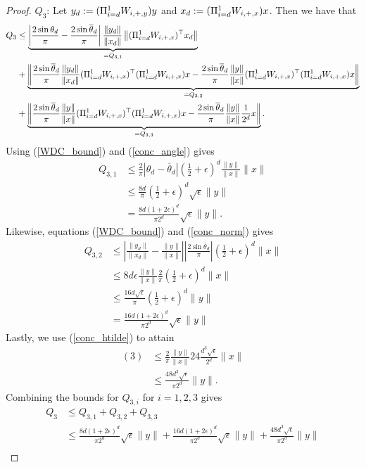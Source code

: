 \documentclass{article}
\begin{document}
\begin{proof}
$Q_3$: Let $y_d : = (\Pi_{i=d}^1 W_{i,+,y})y$ and $x_d : = (\Pi_{i=d}^1 W_{i,+,x})x$. Then we have that \begin{align*}
Q_3 & \leq \underbrace{\left|\frac{2\sin \theta_d}{\pi} - \frac{2\sin \overline{\theta}_d}{\pi}\right|\frac{\|y_d\|}{\|x_d\|}\left\|(\Pi_{i=d}^1 W_{i,+,x})^\top x_d\right\|}_{=Q_{3,1}} \\
& + \underbrace{\left\|\frac{2\sin \overline{\theta}_d}{\pi}\frac{\|y_d\|}{\|x_d\|}(\Pi_{i=d}^1 W_{i,+,x})^\top(\Pi_{i=d}^1 W_{i,+,x})x - \frac{2\sin \overline{\theta}_d}{\pi} \frac{\|y\|}{\|x\|}(\Pi_{i=d}^1 W_{i,+,x})^\top(\Pi_{i=d}^1 W_{i,+,x})x \right\|}_{=Q_{3,2}} \\
& + \underbrace{\left\|\frac{2\sin \overline{\theta}_d}{\pi}\frac{\|y\|}{\|x\|}(\Pi_{i=d}^1 W_{i,+,x})^\top(\Pi_{i=d}^1 W_{i,+,x})x - \frac{2\sin \overline{\theta}_d}{\pi}\frac{\|y\|}{\|x\|}\frac{1}{2^d}x\right\|}_{=Q_{3,3}}.
\end{align*} Using (\ref{WDC_bound}) and (\ref{conc_angle}) gives \begin{align*}
Q_{3,1} & \leq \frac{2}{\pi}|\theta_d - \overline{\theta}_d| \left(\frac{1}{2} + \epsilon\right)^d\frac{\|y\|}{\|x\|}\|x\| \\
& \leq \frac{8d}{\pi}\left(\frac{1}{2} + \epsilon\right)^d \sqrt{\epsilon} \|y\| \\
& = \frac{8d(1 + 2\epsilon)^d}{\pi 2^d}\sqrt{\epsilon}\|y\|.
\end{align*} Likewise, equations (\ref{WDC_bound}) and (\ref{conc_norm}) gives \begin{align*}
Q_{3,2} & \leq \left|\frac{\|y_d\|}{\|x_d\|} - \frac{\|y\|}{\|x\|}\right|\left|\frac{2\sin \overline{\theta}_d}{\pi}\right|\left(\frac{1}{2} + \epsilon\right)^d\|x\| \\
& \leq 8d\epsilon \frac{\|y\|}{\|x\|} \frac{2}{\pi}\left(\frac{1}{2} + \epsilon\right)^d \|x\| \\
& \leq \frac{16d\sqrt{\epsilon}}{\pi} \left(\frac{1}{2} + \epsilon\right)^d \|y\| \\
& = \frac{16d(1+2\epsilon)^d}{\pi 2^d}\sqrt{\epsilon}\|y\|
\end{align*} Lastly, we use (\ref{conc_htilde}) to attain \begin{align*}
(3) & \leq \frac{2}{\pi} \frac{\|y\|}{\|x\|} 24\frac{d^3\sqrt{\epsilon}}{2^d}\|x\| \\
& \leq \frac{48d^3\sqrt{\epsilon}}{\pi2^d}\|y\|.
\end{align*} Combining the bounds for $Q_{3,i}$ for $i = 1,2,3$ gives \begin{align*}
Q_{3} & \leq Q_{3,1} + Q_{3,2} + Q_{3,3} \\ 
& \leq \frac{8d(1 + 2\epsilon)^d}{\pi 2^d}\sqrt{\epsilon}\|y\|+ \frac{16d(1+2\epsilon)^d}{\pi 2^d}\sqrt{\epsilon}\|y\|+ \frac{48d^3\sqrt{\epsilon}}{\pi2^d}\|y\| \\

\end{align*}
\end{proof}
\end{document}
